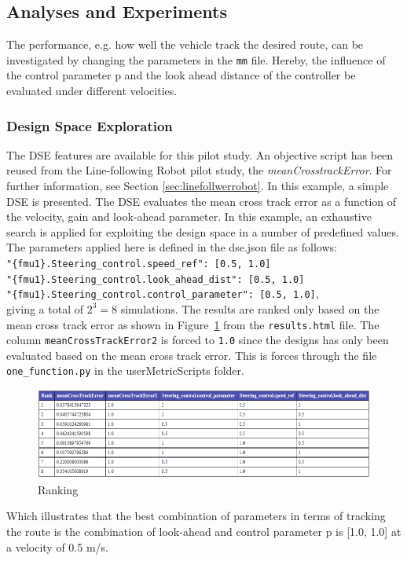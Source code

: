 \subsection{Analyses and Experiments}
The performance, e.g. how well the vehicle track the desired route, can be investigated by changing the parameters in the \texttt{mm} file. Hereby, the influence of the control parameter p and the look ahead distance of the controller be evaluated under different velocities.  
\subsubsection{Design Space Exploration}
The DSE features are available for this pilot study. An objective script has been reused from the Line-following Robot pilot study, the \textit{meanCrosstrackError}. For further information, see Section \ref{sec:linefollwerrobot}. 
In this example, a simple DSE is presented. The DSE evaluates the mean cross track error as a function of the velocity, gain and look-ahead parameter. In this example, an exhaustive search is applied for exploiting the design space in a number of predefined values.
The parameters applied here is defined in the dse.json file as follows:\\
\texttt{"\{fmu1\}.Steering\_control.speed\_ref":  [0.5, 1.0]} \\
\texttt{"\{fmu1\}.Steering\_control.look\_ahead\_dist": [0.5, 1.0]} \\
\texttt{"\{fmu1\}.Steering\_control.control\_parameter": [0.5, 1.0]}, \\
giving a total of $2^3=8$ simulations. The results are ranked only based on the mean cross track error as shown in Figure~\ref{fig:ranking} from the \texttt{results.html} file.  
The column \texttt{mean\-Cross\-Track\-Error2} is forced to \texttt{1.0} since the designs has only been evaluated based on the mean cross track error. This is forces through the file \texttt{one\_function.py} in the userMetricScripts folder. 

\begin{figure}[htbp]
	\begin{center}
		\includegraphics[width=1\textwidth]{vehicle/rank.png}
		\caption{Ranking}
		\label{fig:ranking}
	\end{center}
\end{figure}
Which illustrates that the best combination of parameters in terms of tracking the route is the combination of look-ahead and control parameter p is [1.0, 1.0] at a velocity of 0.5 m/s.